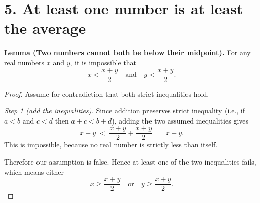 \section*{5. At least one number is at least the average}

\medskip
\noindent\textbf{Lemma (Two numbers cannot both be below their midpoint).}
For any real numbers $x$ and $y$, it is impossible that
\[
x<\frac{x+y}{2}\quad\text{and}\quad y<\frac{x+y}{2}.
\]

\begin{proof}
Assume for contradiction that both strict inequalities hold.

\smallskip
\noindent\emph{Step 1 (add the inequalities).}
Since addition preserves strict inequality (i.e., if $a<b$ and $c<d$ then
$a+c<b+d$), adding the two assumed inequalities gives
\[
x+y\;<\;\frac{x+y}{2}+\frac{x+y}{2}\;=\;x+y.
\]
This is impossible, because no real number is strictly less than itself.

\smallskip
Therefore our assumption is false. Hence at least one of the two inequalities
fails, which means either
\[
x\ge \frac{x+y}{2}\quad\text{or}\quad y\ge \frac{x+y}{2}.
\]
\end{proof}
